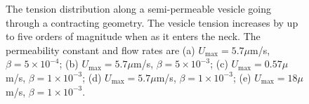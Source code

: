 \documentclass[9pt,twocolumn,twoside,lineno]{pnas-new}
\begin{document}
\begin{figure}[htp]
  \centering
  \caption{\label{fig:contractingTensions1} The tension distribution
  along a semi-permeable vesicle going through a contracting geometry.
  The vesicle tension increases by up to five orders of magnitude when
  as it enters the neck. The permeability constant and flow rates are
  (a) $U_{\max} = 5.7\mu$m/s, $\beta = 5 \times 10^{-4}$; (b) $U_{\max}
  = 5.7\mu$m/s, $\beta = 5 \times 10^{-3}$; (c) $U_{\max} = 0.57\mu$m/s,
  $\beta = 1 \times 10^{-3}$; (d) $U_{\max} = 5.7\mu$m/s, $\beta = 1
  \times 10^{-3}$; (e) $U_{\max} = 18\mu$m/s, $\beta = 1 \times
  10^{-3}$.}
\end{figure}
\end{document}
